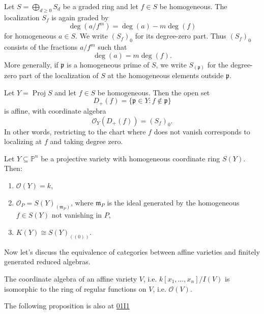 \documentclass{book}
\begin{document}
\begin{definition}
\label{definition-degree-zero-localization}
Let $S=\bigoplus_{d\geq 0} S_d$ be a
graded ring and let $f \in S$ be
homogeneous.
The localization $S_f$ is again graded by
\[
\deg(a/f^m)=\deg(a)-m\deg(f)
\]
for homogeneous $a \in S$.
We write $(S_f)_0$ for its degree-zero
part.
Thus $(S_f)_0$ consists of the fractions
$a/f^m$ such that
\[
\deg(a)=m\deg(f).
\]
More generally, if $\mathfrak{p}$ is a
homogeneous prime of $S$, we write
$S_{(\mathfrak{p})}$ for the degree-zero
part of the localization of $S$ at the
homogeneous elements outside
$\mathfrak{p}$.
\end{definition}

\begin{proposition}
\label{proposition-standard-open-proj}
Let $Y=\operatorname{Proj} S$ and let
$f \in S$ be homogeneous.
Then the open set
\[
D_+(f)=\{\mathfrak{p}\in Y:f\notin
\mathfrak{p}\}
\]
is affine, with coordinate algebra
\[
\mathcal{O}_Y(D_+(f))=(S_f)_0.
\]
In other words, restricting to the chart
where $f$ does not vanish corresponds to
localizing at $f$ and taking degree zero.
\end{proposition}

\begin{theorem}
\label{theorem-functions-projective-case}
\begin{reference}
\cite[Theorem 3.4]{har}
\end{reference}
Let $Y \subseteq \mathbb{P}^n$ be a
projective variety
with homogeneous coordinate ring $S(Y)$.
Then:
\begin{enumerate}
\item $\mathcal{O}(Y)=k$,
\item
$\mathcal{O}_P=S(Y)_{(\mathfrak{m}_P)}$,
where $\mathfrak{m}_P$ is the ideal generated
by the homogeneous
$f \in S(Y)$ not vanishing in $P$,
\item $K(Y)\cong S(Y)_{((0))}$.
\end{enumerate}
\end{theorem}

\noindent
Now let's discuss the equivalence of
categories between
affine varieties and finitely generated
reduced algebras.

\begin{proposition}
\label{proposition-coordinate-algebra}
The coordinate algebra of an affine variety
$V$,
i.e. $k[x_1,…,x_n]/I(V)$ is isomorphic to
the ring of regular functions on $V$, i.e.
$\mathcal{O}(V)$.
\end{proposition}
The following proposition is also at
\href{https://stacks.math.columbia.edu/tag/%
01I1}{01I1}
\end{document}
